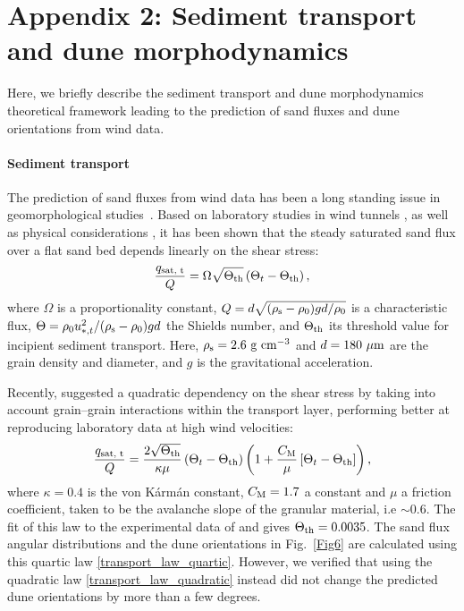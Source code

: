 \section*{Appendix 2: Sediment transport and dune morphodynamics}

Here, we briefly describe the sediment transport and dune morphodynamics theoretical framework leading to the prediction of sand fluxes and dune orientations from wind data.

\paragraph{Sediment transport}
The prediction of sand fluxes from wind data has been a long standing issue in geomorphological studies~\citep{Fryberger79, Pearce2005, Sherman2012, Shen2019}. Based on laboratory studies in wind tunnels \citep{Rasmussen96, Iversen99, Creyssels2009, Ho2011}, as well as physical considerations \citep{Ungar1987, Andreotti2004bis, Duran2011, Pahtz2020}, it has been shown that the steady saturated sand flux over a flat sand bed depends linearly on the shear stress:
\begin{equation}
  \label{transport_law_quadratic}
  \frac{q_{\textup{sat, t}}}{Q} = \Omega\sqrt{\Theta_{\textup{th}}}\left(\Theta_{t} - \Theta_{\textup{th}}\right),
\end{equation}
where $\Omega$ is a proportionality constant, $Q = d\sqrt{(\rho_{\textup{s}} - \rho_{0})gd/\rho_{0}}$ is a characteristic flux, $\Theta = \rho_{0} u_{*, t}^{2}/(\rho_{\textup{s}} - \rho_{0})gd$ the Shields number, and $\Theta_{\textup{th}}$ its threshold value for incipient sediment transport. Here, $\rho_{\textup{s}} = 2.6~\textup{g}~\textup{cm}^{-3}$ and $d=180~\mu\textup{m}$ are the grain density and diameter, and $g$ is the gravitational acceleration.

Recently, \citet{Pahtz2020} suggested a quadratic dependency on the shear stress by taking into account grain--grain interactions within the transport layer, performing better at reproducing laboratory data at high wind velocities:
\begin{equation}
  \label{transport_law_quartic}
  \frac{q_{\textup{sat, t}}}{Q} = \frac{2\sqrt{\Theta_{\textup{th}}}}{\kappa\mu}\left(\Theta_{t} - \Theta_{\textup{th}}\right)\left(1 +\frac{C_{\textup{M}}}{\mu}\left[\Theta_{t} - \Theta_{\textup{th}}\right]\right),
\end{equation}
where $\kappa = 0.4$ is the von Kármán constant, $C_{\rm M}=1.7$ a constant and $\mu$ a friction coefficient, taken to be the avalanche slope of the granular material, i.e $\sim 0.6$. The fit of this law to the experimental data of \citet{Creyssels2009} and \citet{Ho2011} gives $\Theta_{\textup{th}} = 0.0035$. The sand flux angular distributions and the dune orientations in Fig.~\ref{Fig6} are calculated using this quartic law \eqref{transport_law_quartic}. However, we verified that using the quadratic law \eqref{transport_law_quadratic} instead did not change the predicted dune orientations by more than a few degrees.

